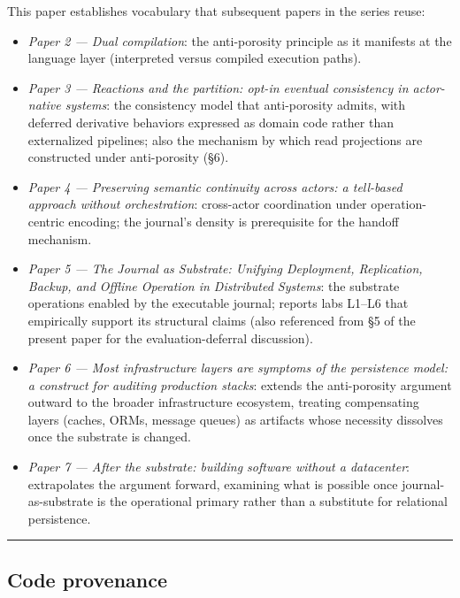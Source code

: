 \documentclass[
]{article}
\providecommand{\tightlist}{%
  \setlength{\itemsep}{0pt}\setlength{\parskip}{0pt}}
\begin{document}
This paper establishes vocabulary that subsequent papers in the series
reuse:

\begin{itemize}
\tightlist
\item
  \emph{Paper 2 --- Dual compilation}: the anti-porosity principle as it
  manifests at the language layer (interpreted versus compiled execution
  paths).
\item
  \emph{Paper 3 --- Reactions and the partition: opt-in eventual
  consistency in actor-native systems}: the consistency model that
  anti-porosity admits, with deferred derivative behaviors expressed as
  domain code rather than externalized pipelines; also the mechanism by
  which read projections are constructed under anti-porosity (§6).
\item
  \emph{Paper 4 --- Preserving semantic continuity across actors: a
  tell-based approach without orchestration}: cross-actor coordination
  under operation-centric encoding; the journal's density is
  prerequisite for the handoff mechanism.
\item
  \emph{Paper 5 --- The Journal as Substrate: Unifying Deployment,
  Replication, Backup, and Offline Operation in Distributed Systems}:
  the substrate operations enabled by the executable journal; reports
  labs L1--L6 that empirically support its structural claims (also
  referenced from §5 of the present paper for the evaluation-deferral
  discussion).
\item
  \emph{Paper 6 --- Most infrastructure layers are symptoms of the
  persistence model: a construct for auditing production stacks}:
  extends the anti-porosity argument outward to the broader
  infrastructure ecosystem, treating compensating layers (caches, ORMs,
  message queues) as artifacts whose necessity dissolves once the
  substrate is changed.
\item
  \emph{Paper 7 --- After the substrate: building software without a
  datacenter}: extrapolates the argument forward, examining what is
  possible once journal-as-substrate is the operational primary rather
  than a substitute for relational persistence.
\end{itemize}

\begin{center}\rule{0.5\linewidth}{0.5pt}\end{center}

\subsection{Code provenance}\label{code-provenance}
\end{document}

